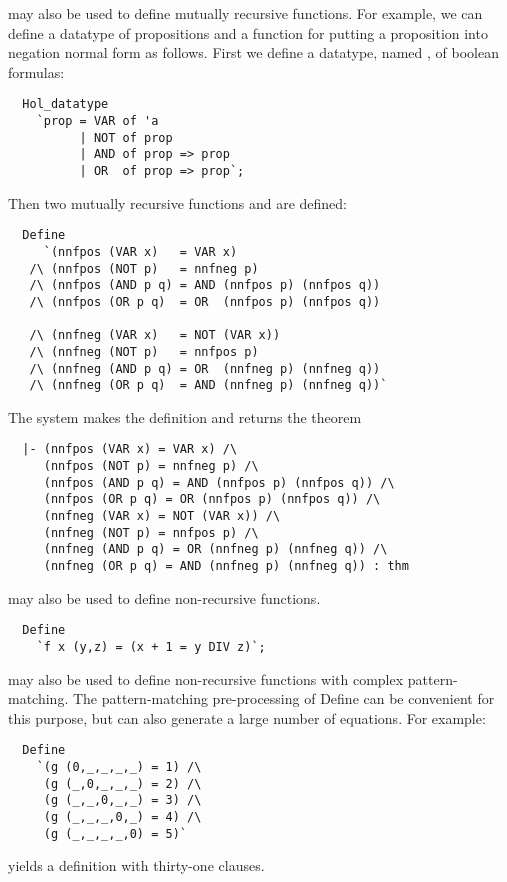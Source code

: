  may also be used to define mutually recursive functions. 
For example, we can define a datatype of propositions and a function for
putting a proposition into negation normal form as follows.  
First we define a datatype, named , of boolean formulas:
%
\begin{hol}
\begin{verbatim}
  Hol_datatype
    `prop = VAR of 'a
          | NOT of prop
          | AND of prop => prop
          | OR  of prop => prop`;
\end{verbatim}
\end{hol}
%
Then two mutually recursive functions  and 
are defined:
%
\begin{hol}
\begin{verbatim}
  Define
     `(nnfpos (VAR x)   = VAR x)
   /\ (nnfpos (NOT p)   = nnfneg p)
   /\ (nnfpos (AND p q) = AND (nnfpos p) (nnfpos q))
   /\ (nnfpos (OR p q)  = OR  (nnfpos p) (nnfpos q))

   /\ (nnfneg (VAR x)   = NOT (VAR x))
   /\ (nnfneg (NOT p)   = nnfpos p)
   /\ (nnfneg (AND p q) = OR  (nnfneg p) (nnfneg q))
   /\ (nnfneg (OR p q)  = AND (nnfneg p) (nnfneg q))`
\end{verbatim}
\end{hol}
%
The system makes the definition and returns the theorem
%
\begin{hol}
\begin{verbatim}
  |- (nnfpos (VAR x) = VAR x) /\
     (nnfpos (NOT p) = nnfneg p) /\
     (nnfpos (AND p q) = AND (nnfpos p) (nnfpos q)) /\
     (nnfpos (OR p q) = OR (nnfpos p) (nnfpos q)) /\
     (nnfneg (VAR x) = NOT (VAR x)) /\
     (nnfneg (NOT p) = nnfpos p) /\
     (nnfneg (AND p q) = OR (nnfneg p) (nnfneg q)) /\
     (nnfneg (OR p q) = AND (nnfneg p) (nnfneg q)) : thm
\end{verbatim}
\end{hol}
 
\ml{Define} may also be used to define non-recursive functions.
%
\begin{hol}
\begin{verbatim}
  Define 
    `f x (y,z) = (x + 1 = y DIV z)`;
\end{verbatim}
\end{hol}

\ml{Define} may also be used to define non-recursive functions
with complex pattern-matching. The pattern-matching pre-processing of
{Define} can be convenient for this purpose, but can also generate a
large number of equations. For example:
%
\begin{hol}
\begin{verbatim}
  Define 
    `(g (0,_,_,_,_) = 1) /\
     (g (_,0,_,_,_) = 2) /\
     (g (_,_,0,_,_) = 3) /\
     (g (_,_,_,0,_) = 4) /\
     (g (_,_,_,_,0) = 5)`
\end{verbatim}
\end{hol}
%
yields a definition with thirty-one clauses.


